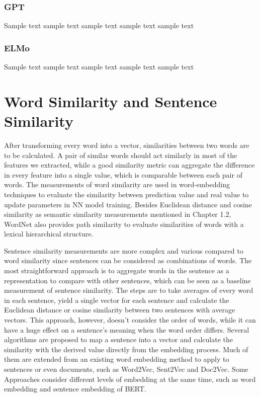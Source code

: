 \subsubsection{GPT}
Sample text sample text sample text sample text sample text

\subsubsection{ELMo}
Sample text sample text sample text sample text sample text

\section{Word Similarity and Sentence Similarity}
After transforming every word into a vector, similarities between two words are to be calculated. 
A pair of similar words should act similarly in most of the features we extracted, while a good similarity metric can aggregate the difference in every feature into a single value, which is comparable between each pair of words.
The measurements of word similarity are used in word-embedding techniques to evaluate the similarity between prediction value and real value to update parameters in NN model training.
Besides Euclidean distance and cosine similarity as semantic similarity measurements mentioned in Chapter 1.2, WordNet also provides path similarity to evaluate similarities of words with a lexical hierarchical structure.

Sentence similarity measurements are more complex and various compared to word similarity since sentences can be considered as combinations of words.
The most straightforward approach is to aggregate words in the sentence as a representation to compare with other sentences, which can be seen as a baseline measurement of sentence similarity.
The steps are to take averages of every word in each sentence, yield a single vector for each sentence and calculate the Euclidean distance or cosine similarity between two sentences with average vectors.
This approach, however, doesn't consider the order of words, while it can have a huge effect on a sentence's meaning when the word order differs.
Several algorithms are proposed to map a sentence into a vector and calculate the similarity with the derived value directly from the embedding process.
Much of them are extended from an existing word embedding method to apply to sentences or even documents, such as Word2Vec, Sent2Vec and Doc2Vec.
Some Approaches consider different levels of embedding at the same time, such as word embedding and sentence embedding of BERT.

